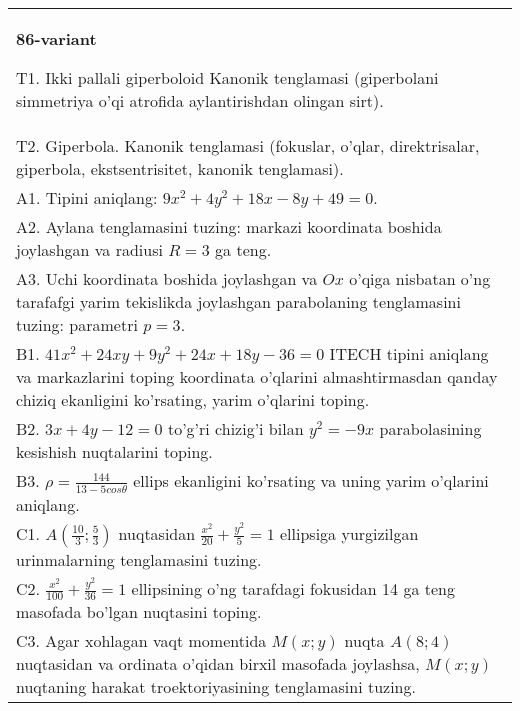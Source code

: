 \documentclass{article}
\begin{document}
\begin{tabular}{m{17cm}}
\textbf{86-variant}
\newline

T1. Ikki pallali giperboloid Kanonik tenglamasi (giperbolani simmetriya o'qi atrofida aylantirishdan olingan sirt).\\

T2. Giperbola. Kanonik tenglamasi (fokuslar, o'qlar, direktrisalar, giperbola, ekstsentrisitet, kanonik tenglamasi).\\

A1. Tipini aniqlang: $9x^{2}+4y^{2}+18x-8y+49=0$.\\

A2. Aylana tenglamasini tuzing: markazi koordinata boshida joylashgan va radiusi $R=3$ ga teng.\\

A3. Uchi koordinata boshida joylashgan va $Ox$ o'qiga nisbatan o'ng tarafafgi yarim tekislikda joylashgan parabolaning tenglamasini tuzing: parametri $p=3$.\\

B1. $41x^{2} + 24xy + 9y^{2} + 24x + 18y - 36 = 0$ ITECH tipini aniqlang va markazlarini toping koordinata o'qlarini almashtirmasdan qanday chiziq ekanligini ko'rsating, yarim o'qlarini toping.  \\

B2. $3x + 4y - 12 = 0$ to'g'ri chizig'i bilan $y^{2} = - 9x$ parabolasining kesishish nuqtalarini toping.  \\

B3. $\rho = \frac{144}{13 - 5cos\theta}$ ellips ekanligini ko'rsating va uning yarim o'qlarini aniqlang.\\

C1. $A(\frac{10}{3};\frac{5}{3})$ nuqtasidan $\frac{x^{2}}{20} + \frac{y^{2}}{5} = 1$ ellipsiga yurgizilgan urinmalarning tenglamasini tuzing.  \\

C2. $\frac{x^{2}}{100} + \frac{y^{2}}{36} = 1$ ellipsining o'ng tarafdagi fokusidan 14 ga teng masofada bo'lgan nuqtasini toping.  \\

C3. Agar xohlagan vaqt momentida $M(x;y)$ nuqta $A(8;4)$ nuqtasidan va ordinata o'qidan birxil masofada joylashsa, $M(x;y)$ nuqtaning harakat troektoriyasining tenglamasini tuzing.  \\

\end{tabular}
\vspace{1cm}
\end{document}
